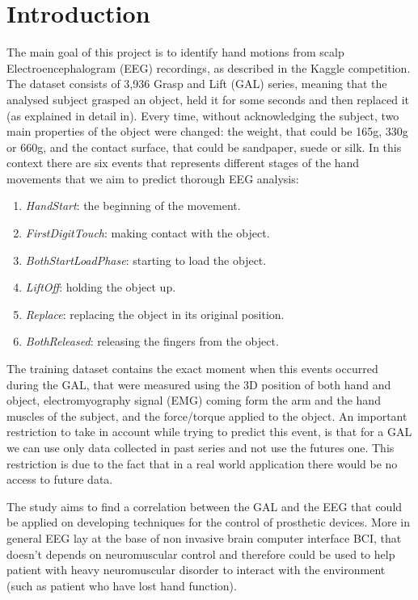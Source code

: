 \documentclass[]{article}
\begin{document}
\section{Introduction}
The main goal of this project is to identify hand motions from scalp Electroencephalogram (EEG) recordings, as described in the Kaggle competition\cite{kaggle}.
The dataset consists of 3,936 Grasp and Lift (GAL) series, meaning that the analysed subject grasped an object, held it for some seconds and then replaced it (as explained in detail in\cite{experiment}). 
Every time, without acknowledging the subject, two main properties of the object were changed: the  weight, that could be 165g, 330g or 660g, and the contact surface, that could be sandpaper, suede or silk.  In this context there are six events that represents different stages of the hand movements that we aim to predict thorough EEG analysis: 
\begin{enumerate} 
  \item \textit{HandStart}: the beginning of the movement.
  \item \textit{FirstDigitTouch}: making contact with the object.  
  \item \textit{BothStartLoadPhase}: starting to load the object. 
  \item \textit{LiftOff}: holding the object up.
  \item \textit{Replace}: replacing the object in its original position.
  \item \textit{BothReleased}: releasing the fingers from the object. 
\end{enumerate}
The training dataset contains the exact moment when this events occurred during the GAL, that were measured using the 3D position of both hand and object, electromyography signal (EMG) coming form the arm and the hand muscles of the subject, and the force/torque applied to the object. 
An important restriction to take in account while trying to predict this event, is that for a GAL we can use only data collected in past series and not use the futures one.  
This restriction is due to the fact that in a real world application there would be no access to future data.

The study aims to find a correlation between the GAL and the EEG  that could be applied on developing techniques for the control of prosthetic devices. More in general EEG lay at the base of non invasive brain computer interface BCI\cite{BCI}, that doesn't depends on neuromuscular control and therefore could be used to help patient with heavy neuromuscular disorder to interact with the environment (such as patient who have lost hand function). 
\end{document}
